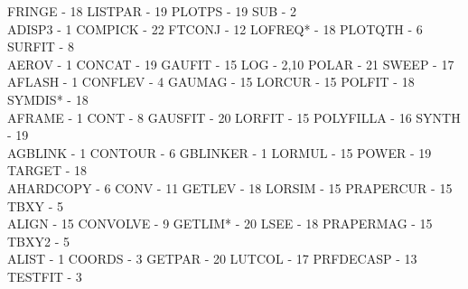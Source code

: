 {\begin{tabbing}
   \>FRINGE - 18                             \>
 LISTPAR - 19                            \>PLOTPS - 19                           
   \>SUB - 2                                 \\
 ADISP3 - 1                              \>COMPICK - 22                          
   \>FTCONJ - 12                             \>
 LOFREQ* - 18                            \>PLOTQTH - 6                           
   \>SURFIT - 8                              \\
 AEROV - 1                               \>CONCAT - 19                           
   \>GAUFIT - 15                             \>
 LOG - 2,10                              \>POLAR - 21                            
   \>SWEEP - 17                              \\
 AFLASH - 1                              \>CONFLEV - 4                           
   \>GAUMAG - 15                             \>
 LORCUR - 15                             \>POLFIT - 18                           
   \>SYMDIS* - 18                            \\
 AFRAME - 1                              \>CONT - 8                              
   \>GAUSFIT - 20                            \>
 LORFIT - 15                             \>POLYFILLA - 16                        
   \>SYNTH - 19                              \\
 AGBLINK - 1                             \>CONTOUR - 6                           
   \>GBLINKER - 1                            \>
 LORMUL - 15                             \>POWER - 19                            
   \>TARGET - 18                             \\
 AHARDCOPY - 6                           \>CONV - 11                             
   \>GETLEV - 18                             \>
 LORSIM - 15                             \>PRAPERCUR - 15                        
   \>TBXY - 5                                \\
 ALIGN - 15                              \>CONVOLVE - 9                          
   \>GETLIM* - 20                            \>
 LSEE - 18                               \>PRAPERMAG - 15                        
   \>TBXY2 - 5                               \\
 ALIST - 1                               \>COORDS - 3                            
   \>GETPAR - 20                             \>
 LUTCOL - 17                             \>PRFDECASP - 13                        
   \>TESTFIT - 3                             \\

\end{tabbing}}

